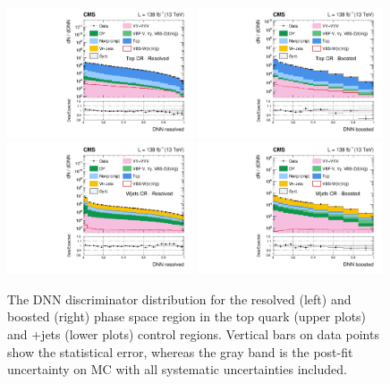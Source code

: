 \begin{figure}[!htb]
  \centering
  \includegraphics[width=0.49\textwidth]{Images/VBS_Studies/Figure_004-a.pdf}
  \includegraphics[width=0.49\textwidth]{Images/VBS_Studies/Figure_004-b.pdf}
  \includegraphics[width=0.49\textwidth]{Images/VBS_Studies/Figure_004-c.pdf}
  \includegraphics[width=0.49\textwidth]{Images/VBS_Studies/Figure_004-d.pdf}
  \caption{
    The DNN discriminator distribution for the resolved (left) and boosted (right) phase space region in the top quark
    (upper plots) and {\PW}+jets (lower plots) control regions.  Vertical bars on data points show the statistical
    error, whereas the gray band is the post-fit uncertainty on MC with all systematic uncertainties included.
    } \label{fig:CR:dnn}
\end{figure}


